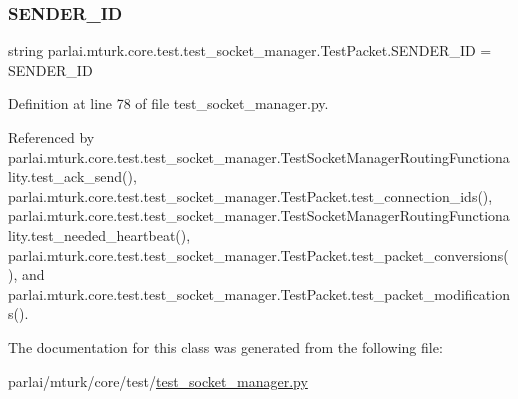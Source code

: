 \subsubsection{\texorpdfstring{S\+E\+N\+D\+E\+R\+\_\+\+ID}{SENDER\_ID}}
{\footnotesize\ttfamily string parlai.\+mturk.\+core.\+test.\+test\+\_\+socket\+\_\+manager.\+Test\+Packet.\+S\+E\+N\+D\+E\+R\+\_\+\+ID = \textquotesingle{}S\+E\+N\+D\+E\+R\+\_\+\+ID\textquotesingle{}\hspace{0.3cm}{\ttfamily [static]}}



Definition at line 78 of file test\+\_\+socket\+\_\+manager.\+py.



Referenced by parlai.\+mturk.\+core.\+test.\+test\+\_\+socket\+\_\+manager.\+Test\+Socket\+Manager\+Routing\+Functionality.\+test\+\_\+ack\+\_\+send(), parlai.\+mturk.\+core.\+test.\+test\+\_\+socket\+\_\+manager.\+Test\+Packet.\+test\+\_\+connection\+\_\+ids(), parlai.\+mturk.\+core.\+test.\+test\+\_\+socket\+\_\+manager.\+Test\+Socket\+Manager\+Routing\+Functionality.\+test\+\_\+needed\+\_\+heartbeat(), parlai.\+mturk.\+core.\+test.\+test\+\_\+socket\+\_\+manager.\+Test\+Packet.\+test\+\_\+packet\+\_\+conversions(), and parlai.\+mturk.\+core.\+test.\+test\+\_\+socket\+\_\+manager.\+Test\+Packet.\+test\+\_\+packet\+\_\+modifications().



The documentation for this class was generated from the following file\+:\begin{DoxyCompactItemize}
\item 
parlai/mturk/core/test/\hyperlink{test_2test__socket__manager_8py}{test\+\_\+socket\+\_\+manager.\+py}\end{DoxyCompactItemize}

